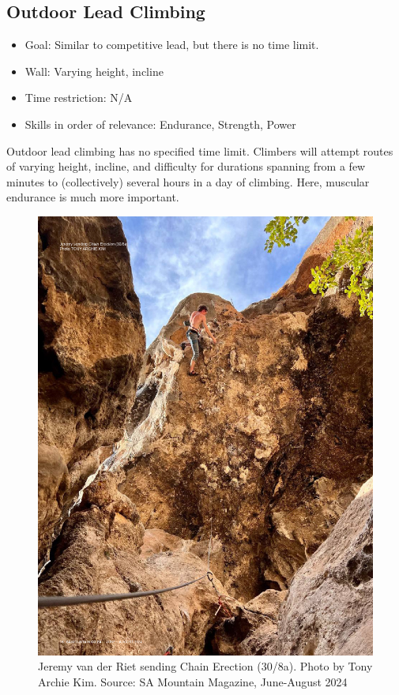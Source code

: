 \subsection{Outdoor Lead Climbing}
\begin{itemize}
    \item Goal: Similar to competitive lead, but there is no time limit.
    \item Wall: Varying height, incline
    \item Time restriction: N/A
    \item Skills in order of relevance: Endurance, Strength, Power
\end{itemize}
Outdoor lead climbing has no specified time limit. Climbers will attempt routes of varying height, incline, and difficulty for durations spanning from a few minutes to (collectively) several hours in a day of climbing. Here, muscular endurance is much more important.
\begin{figure}[H]
    \centering
    \includegraphics[width=0.9\linewidth]{figs/outdoor_lead.png}
    \caption{Jeremy van der Riet sending Chain Erection (30/8a). Photo by Tony Archie Kim. Source: SA Mountain Magazine, June-August 2024}
\end{figure}



